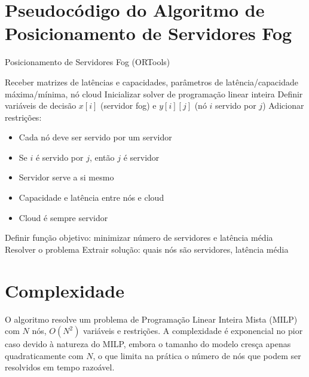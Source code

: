 \documentclass{article}
\begin{document}
\section*{Pseudocódigo do Algoritmo de Posicionamento de Servidores Fog}

\begin{algorithm}[H]
\caption{Posicionamento de Servidores Fog (ORTools)}
\begin{algorithmic}[1]
\State Receber matrizes de latências e capacidades, parâmetros de latência/capacidade máxima/mínima, nó cloud
\State Inicializar solver de programação linear inteira
\State Definir variáveis de decisão $x[i]$ (servidor fog) e $y[i][j]$ (nó $i$ servido por $j$)
\State Adicionar restrições:
    \begin{itemize}
        \item Cada nó deve ser servido por um servidor
        \item Se $i$ é servido por $j$, então $j$ é servidor
        \item Servidor serve a si mesmo
        \item Capacidade e latência entre nós e cloud
        \item Cloud é sempre servidor
    \end{itemize}
\State Definir função objetivo: minimizar número de servidores e latência média
\State Resolver o problema
\State Extrair solução: quais nós são servidores, latência média
\end{algorithmic}
\end{algorithm}

\section*{Complexidade}
O algoritmo resolve um problema de Programação Linear Inteira Mista (MILP) com \(N\) nós, \(O(N^2)\) variáveis e restrições. A complexidade é exponencial no pior caso devido à natureza do MILP, embora o tamanho do modelo cresça apenas quadraticamente com \(N\), o que limita na prática o número de nós que podem ser resolvidos em tempo razoável.
\end{document}
